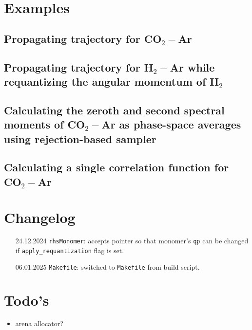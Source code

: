 \documentclass{article}
\begin{document}
\section{Examples}
\label{sec:examples}

\subsection{Propagating trajectory for CO$_2-$Ar}
\label{subsec:trajectory}

\subsection{Propagating trajectory for H$_2-$Ar while requantizing the angular momentum of H$_2$}
\label{subsec:req-trajectory}

\subsection{Calculating the zeroth and second spectral moments of CO$_2-$Ar as phase-space averages using rejection-based sampler}
\label{subsec:spmoments-co2-ar}

\subsection{Calculating a single correlation function for CO$_2-$Ar}
\label{subsec:correlation-co2-ar}

\section{Changelog}
\label{sec:changelog}

\begin{enumerate}
    \item [24.12.2024] \texttt{rhsMonomer}: accepts pointer so that monomer's \texttt{qp} can be changed if \texttt{apply\_requantization} flag is set.
    \item [06.01.2025] \texttt{Makefile}: switched to \texttt{Makefile} from build script.
\end{enumerate}

\section{Todo's}

\begin{itemize}
    \item arena allocator?
\end{itemize}
\end{document}
